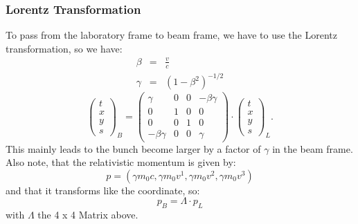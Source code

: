 \subsubsection{Lorentz Transformation}
To pass from the laboratory frame to beam frame, we have to use the Lorentz transformation, so we have:
\begin{eqnarray}
\beta &=& \frac v c \\
\gamma &=& \left(1 - \beta^2\right)^{-1/2}
\end{eqnarray}
\begin{equation}
\left(\begin{array}{c}t\\x\\y\\s \end{array}\right)_B =
\left( \begin{array}{cccc}
\gamma & 0 & 0 & - \beta \gamma \\ 
0 & 1 & 0 & 0 \\ 
0 & 0 & 1 & 0 \\ 
- \beta \gamma & 0 & 0 & \gamma 
\end{array} \right) 
\cdot \left(\begin{array}{c}t\\x\\y\\s\end{array} \right)_L.
\end{equation}
This mainly leads to the bunch become larger by a factor of $\gamma$ in the beam frame. Also note, that the relativistic momentum is given by:
\begin{equation}
p = (\gamma m_0 c, \gamma m_0 v^1, \gamma m_0 v^2, \gamma m_0 v^3)
\end{equation}
and that it transforms like the coordinate, so:
\begin{equation} p_B = \Lambda \cdot p_L \end{equation}
with $\Lambda$ the 4 x 4 Matrix above.

